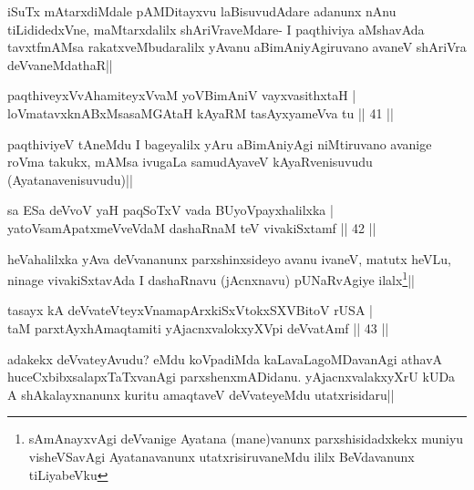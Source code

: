 \begin{artha}
iSuTx mAtarxdiMdale pAMDitayxvu laBisuvudAdare adanunx nAnu tiLididedxVne, maMtarxdalilx shAriVraveMdare- I paqthiviya aMshavAda tavxtfmAMsa rakatxveMbudaralilx yAvanu aBimAniyAgiruvano avaneV shAriVra deVvaneMdathaR||
\end{artha}


\begin{shl}
paqthiveyxVvAhamiteyxVvaM yoV\s BimAniV vayxvasithxtaH |\\
loVmatavxknABxMsasaMGAtaH kAyaRM tasAyxyameVva tu \hfill || 41 ||
\end{shl}

\begin{artha}
paqthiviyeV tAneMdu I bageyalilx yAru aBimAniyAgi niMtiruvano avanige roVma takukx, mAMsa ivugaLa samudAyaveV kAyaRvenisuvudu (Ayatanavenisuvudu)||
\end{artha}


\begin{shl}
sa ESa deVvoV yaH paqSoTxV vada BUyoV\s payxhalilxka |\\
yatoV\s samApatxmeVveVdaM dashaRnaM teV vivakiSxtamf \hfill || 42 ||
\end{shl}

\begin{artha}
heVahalilxka yAva deVvananunx parxshinxsideyo avanu ivaneV, matutx heVLu, ninage vivakiSxtavAda I dashaRnavu (jAcnxnavu) pUNaRvAgiye ilalx\footnote[1]{sAmAnayxvAgi deVvanige Ayatana (mane)vanunx parxshisidadxkekx muniyu visheVSavAgi Ayatanavanunx utatxrisiruvaneMdu ililx BeVdavanunx tiLiyabeVku}||
\end{artha}


\begin{shl}
tasayx kA deVvateVteyxVnamapArxkiSxVtokxSXVBitoV rUSA |\\
taM parxtAyxhAmaqtamiti yAjacnxvalokxyXV\s pi deVvatAmf \hfill || 43 ||
\end{shl}

\begin{artha}%
adakekx deVvateyAvudu? eMdu koVpadiMda kaLavaLagoMDavanAgi athavA huceCxbibxsalapxTaTxvanAgi parxshenxmADidanu. yAjacnxvalakxyXrU kUDa A shAkalayxnanunx kuritu amaqtaveV deVvateyeMdu utatxrisidaru||
\end{artha}


